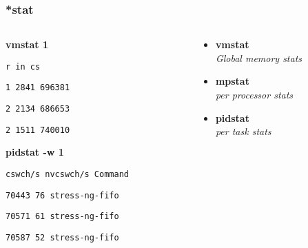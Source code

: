 \begin{frame}
	\frametitle{*stat}
	\begin{columns}
		\begin{column}[t]{0.5\linewidth}
\textbf{vmstat 1}

\texttt{r in   cs}

\texttt{1 2841 696381 }

\texttt{2 2134 686653 }

\texttt{2 1511 740010 }

			\vspace{1cm}
\textbf{pidstat -w 1}

\texttt{cswch/s nvcswch/s  Command }

\texttt{70443   76         stress-ng-fifo }

\texttt{70571   61         stress-ng-fifo }

\texttt{70587   52         stress-ng-fifo }

		\end{column}
		\begin{column}[t]{0.5\linewidth}
			\begin{itemize}
				\item \textbf{vmstat} \\ {\small{\textit{Global memory stats}}}
				\item \textbf{mpstat} \\ {\small{\textit{per processor stats}}}
				\item \textbf{pidstat}\\ {\small{\textit{per task stats}}}
			\end{itemize}
		\end{column}
	\end{columns}
\end{frame}

